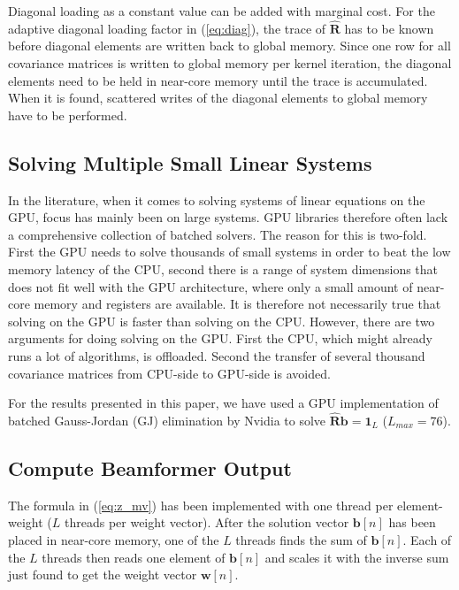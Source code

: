 \documentclass[conference]{IEEEtran}
\newcommand{\mat}[1]{\mathbf{#1}}
\renewcommand{\vec}[1]{\mathbf{#1}}
\begin{document}
Diagonal loading as a constant value can be added with marginal cost. For the adaptive diagonal loading factor in (\ref{eq:diag}), the trace of $\mat{\hat{R}}$ has to be known before diagonal elements are written back to global memory. Since one row for all covariance matrices is written to global memory per kernel iteration, the diagonal elements need to be held in near-core memory until the trace is accumulated. When it is found, scattered writes of the diagonal elements to global memory have to be performed. 

\subsection{Solving Multiple Small Linear Systems}
In the literature, when it comes to solving systems of linear equations on the GPU, focus has mainly been on large systems. GPU libraries therefore often lack a comprehensive collection of batched solvers. The reason for this is two-fold. First the GPU needs to solve thousands of small systems in order to beat the low memory latency of the CPU, second there is a range of system dimensions that does not fit well with the GPU architecture, where only a small amount of near-core memory and registers are available. 
It is therefore not necessarily true that solving on the GPU is faster than solving on the CPU. However, there are two arguments for doing solving on the GPU. First the CPU, which might already runs a lot of algorithms, is offloaded. Second the transfer of several thousand covariance matrices from CPU-side to GPU-side is avoided.

For the results presented in this paper, we have used a GPU implementation of batched Gauss-Jordan (GJ) elimination by Nvidia to solve $\mat{\hat{R}}\vec{b} = \vec{1}_L$ ($L_{max} = 76$).

\subsection{Compute Beamformer Output}
The formula in (\ref{eq:z_mv}) has been implemented with one thread per element-weight ($L$ threads per weight vector). After the solution vector $\vec{b}[n]$ has been placed in near-core memory, one of the $L$ threads finds the sum of $\vec{b}[n]$. Each of the $L$ threads then reads one element of $\vec{b}[n]$ and scales it with the inverse sum just found to get the weight vector $\vec{w}[n]$. 
\end{document}
